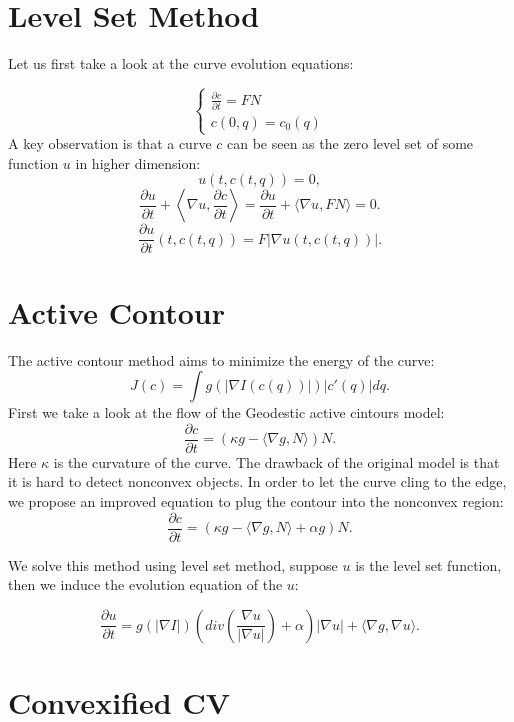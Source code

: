 \documentclass{article}
\title{\showtitle}
\author{\showauthor}
\begin{document}
\maketitle
\thispagestyle{fancy}
\section{Level Set Method}
Let us first take a look at the curve evolution equations:

$$\left\{ \begin{array} { l } { \frac { \partial c } { \partial t } = F N } \\ { c ( 0 , q ) = c _ { 0 } ( q ) } \end{array} \right.$$
A key observation is that a curve $c$ can be seen as the zero level set of some function $u$ in higher dimension:
$$u ( t , c ( t , q ) ) = 0,$$
$$\frac { \partial u } { \partial t } + \left\langle \nabla u , \frac { \partial c } { \partial t } \right\rangle = \frac { \partial u } { \partial t } + \langle \nabla u , F N \rangle = 0.$$
$$\frac { \partial u } { \partial t } ( t , c ( t , q ) ) = F | \nabla u ( t , c ( t , q ) ) |.$$
\section{Active Contour}

The active contour method aims to minimize the energy of the curve:
$$J(c) = \int g(|\nabla I(c(q))|) |c'(q)| dq.$$
First we take a look at the flow of the Geodestic active cintours model:
$$\frac{\partial c}{\partial t} = (\kappa g - \langle\nabla g,N \rangle )N.$$
Here $\kappa$ is the curvature of the curve. 
The drawback of the original model is that it is hard to detect nonconvex objects. In order to let the curve cling to the edge, we propose an improved equation to plug the contour into the nonconvex region:
$$
\frac{\partial c}{\partial t} = (\kappa g - \langle\nabla g,N \rangle  + \alpha g)N.$$

We solve this method using level set method, suppose $u$ is the level set function, then we induce the evolution equation of the $u$:

\begin{equation}
\label{model:ac}
\frac{\partial u}{\partial t} = g(|\nabla I|)\left(div \left(\frac{\nabla u}{|\nabla u|}\right) + \alpha\right) |\nabla u| + \langle \nabla g, \nabla u\rangle.\end{equation}

\section{Convexified CV}
\end{document}
